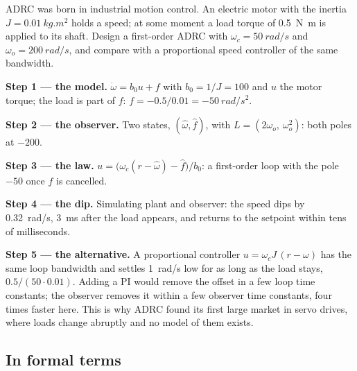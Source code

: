 \begin{example}
\label{ex:adrc-drive}
ADRC was born in industrial motion control. An electric motor with the inertia $J = \SI{0.01}{kg.m^2}$ holds a speed; at some moment a load torque of \SI{0.5}{N.m} is applied to its shaft. Design a first-order ADRC with $\omega_c = \SI{50}{rad/s}$ and $\omega_o = \SI{200}{rad/s}$, and compare with a proportional speed controller of the same bandwidth.

\textbf{Step 1 — the model.} $\dot\omega = b_0u + f$ with $b_0 = 1/J = 100$ and $u$ the motor torque; the load is part of $f$: $f = -0.5/0.01 = \SI{-50}{rad/s^2}$.

\textbf{Step 2 — the observer.} Two states, $(\hat\omega, \hat f)$, with $L = (2\omega_o,\ \omega_o^2)$: both poles at $-200$.

\textbf{Step 3 — the law.} $u = \big(\omega_c(r - \hat\omega) - \hat f\big)/b_0$: a first-order loop with the pole $-50$ once $f$ is cancelled.

\textbf{Step 4 — the dip.} Simulating plant and observer: the speed dips by \SI{0.32}{rad/s}, \SI{3}{ms} after the load appears, and returns to the setpoint within tens of milliseconds.

\textbf{Step 5 — the alternative.} A proportional controller $u = \omega_cJ\,(r - \omega)$ has the same loop bandwidth and settles \SI{1}{rad/s} low for as long as the load stays, $0.5/(50 \cdot 0.01)$. Adding a PI would remove the offset in a few loop time constants; the observer removes it within a few observer time constants, four times faster here. This is why ADRC found its first large market in servo drives, where loads change abruptly and no model of them exists.
\end{example}

\subsection{In formal terms}

